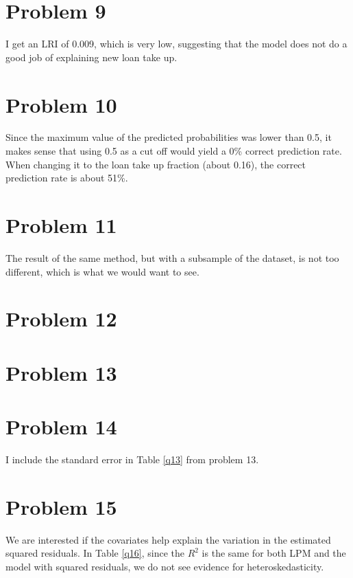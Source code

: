 \documentclass[11pt]{article}
\begin{document}
\section*{Problem 9}
I get an LRI of 0.009, which is very low, suggesting that the model does not do a good job of explaining new loan take up. 


\section*{Problem 10}
Since the maximum value of the predicted probabilities was lower than 0.5, it makes sense that using 0.5 as a cut off would yield a 0\% correct prediction rate. When changing it to the loan take up fraction (about 0.16), the correct prediction rate is about 51\%. 


\newpage
\section*{Problem 11}
The result of the same method, but with a subsample of the dataset, is not too different, which is what we would want to see. 


\newpage
\section*{Problem 12}


\newpage 
\section*{Problem 13}


\section*{Problem 14}
I include the standard error in Table \ref{q13} from problem 13. 


\section*{Problem 15}
We are interested if the covariates help explain the variation in the estimated squared residuals.  In Table \ref{q16}, since the $R^2$ is the same for both LPM and the model with squared residuals, we do not see evidence for heteroskedasticity.
\end{document}
